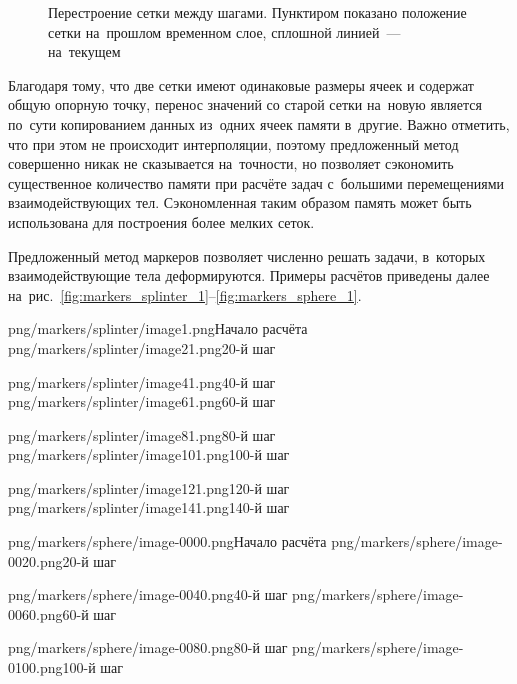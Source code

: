 \documentclass[thesis.tex]{subfiles}
\begin{document}
    \begin{figure}[h!]
        \centering
        \caption{Перестроение сетки между шагами. Пунктиром показано положение сетки на~прошлом временном слое, сплошной
                 линией~--- на~текущем}
        \label{fig:markers-adaptive-grid}
    \end{figure}

    Благодаря тому, что две сетки имеют одинаковые размеры ячеек и содержат общую опорную точку, перенос значений со
    старой сетки на~новую является по~сути копированием данных из~одних ячеек памяти в~другие. Важно отметить, что при
    этом не происходит интерполяции, поэтому предложенный метод совершенно никак не сказывается на~точности, но
    позволяет сэкономить существенное количество памяти при расчёте задач с~большими перемещениями взаимодействующих
    тел. Сэкономленная таким образом память может быть использована для построения более мелких сеток.


    Предложенный метод маркеров позволяет численно решать задачи, в~которых взаимодействующие тела деформируются.
    Примеры расчётов приведены далее на~рис.~\ref{fig:markers_splinter_1}--\ref{fig:markers_sphere_1}.

        {png/markers/splinter/image1.png}{Начало расчёта}
        {png/markers/splinter/image21.png}{20-й шаг}

        {png/markers/splinter/image41.png}{40-й шаг}
        {png/markers/splinter/image61.png}{60-й шаг}

        {png/markers/splinter/image81.png}{80-й шаг}
        {png/markers/splinter/image101.png}{100-й шаг}

        {png/markers/splinter/image121.png}{120-й шаг}
        {png/markers/splinter/image141.png}{140-й шаг}

        {png/markers/sphere/image-0000.png}{Начало расчёта}
        {png/markers/sphere/image-0020.png}{20-й шаг}

        {png/markers/sphere/image-0040.png}{40-й шаг}
        {png/markers/sphere/image-0060.png}{60-й шаг}

        {png/markers/sphere/image-0080.png}{80-й шаг}
        {png/markers/sphere/image-0100.png}{100-й шаг}
\end{document}
